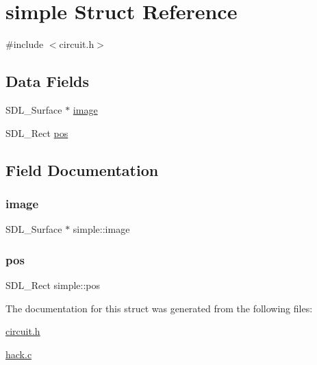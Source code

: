 \hypertarget{structsimple}{}\section{simple Struct Reference}
\label{structsimple}


{\ttfamily \#include $<$circuit.\+h$>$}

\subsection*{Data Fields}
\begin{DoxyCompactItemize}
\item 
S\+D\+L\+\_\+\+Surface $\ast$ \hyperlink{structsimple_aa13dac670d4759e6fd7de7c3d2d10440}{image}
\item 
S\+D\+L\+\_\+\+Rect \hyperlink{structsimple_a87dc9ff3f1d816ced376e752e3c4c88b}{pos}
\end{DoxyCompactItemize}


\subsection{Field Documentation}
\mbox{\label{structsimple_aa13dac670d4759e6fd7de7c3d2d10440}} 
\subsubsection{\texorpdfstring{image}{image}}
{\footnotesize\ttfamily S\+D\+L\+\_\+\+Surface $\ast$ simple\+::image}

\mbox{\label{structsimple_a87dc9ff3f1d816ced376e752e3c4c88b}} 
\subsubsection{\texorpdfstring{pos}{pos}}
{\footnotesize\ttfamily S\+D\+L\+\_\+\+Rect simple\+::pos}



The documentation for this struct was generated from the following files\+:\begin{DoxyCompactItemize}
\item 
\hyperlink{circuit_8h}{circuit.\+h}\item 
\hyperlink{hack_8c}{hack.\+c}\end{DoxyCompactItemize}
